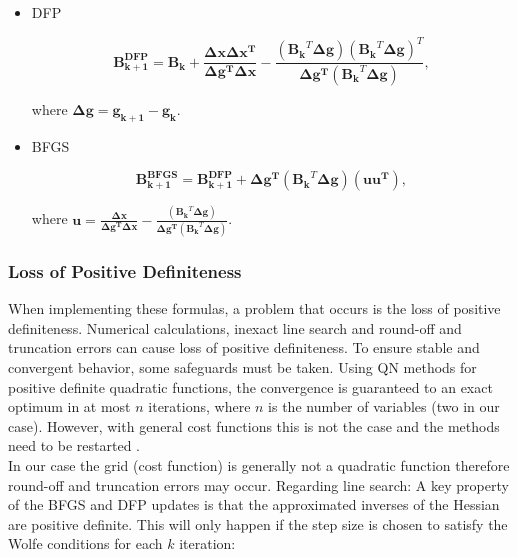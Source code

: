 \begin{itemize}
	\item DFP
	
	\begin{equation}
	 \mathbf{B_{k+1}^{DFP}} =  \mathbf{B_k} + 	\frac{\mathbf{\Delta x}   \mathbf{\Delta x^{T}}}		
	 {\mathbf{\Delta g^{T}}  \mathbf{\Delta x}  } -  \frac{(\mathbf{B_{k}}^{T}  \mathbf{\Delta g}) (\mathbf{B_{k}}^{T}  \mathbf{\Delta g})^{T}  }
	 {\mathbf{\Delta g^{T}} (\mathbf{B_{k}}^{T}  \mathbf{\Delta g})   },
	 \label{eq:DFP}
	\end{equation}
	
	where $\mathbf{\Delta g} = \mathbf{g_{k+1} }- \mathbf{g_k} $.
	
	\item BFGS
	
	\begin{equation}
	\mathbf{B_{k+1}^{BFGS}} =  \mathbf{B_{k+1}^{DFP}} + \mathbf{\Delta g^{T}}(\mathbf{B_{k}}^{T}  \mathbf{\Delta g})(\mathbf{u}  \mathbf{u^{T}})	,
	\end{equation}	
	
	where $\mathbf{u} = \frac{\mathbf{\Delta x}}		
	{\mathbf{\Delta g^{T}}  \mathbf{\Delta x}} - \frac{(\mathbf{B_{k}}^{T}  \mathbf{\Delta g})   }
	{\mathbf{\Delta g^{T}} (\mathbf{B_{k}}^{T}  \mathbf{\Delta g})   }$.
	

\end{itemize}


\subsubsection{Loss of Positive Definiteness}
\label{subsubsec:loss_pdness}

When implementing these formulas, a problem that occurs is the loss of positive definiteness. Numerical calculations, inexact line search and round-off and truncation errors can cause loss of positive definiteness. To ensure stable and convergent behavior, some safeguards must be taken. 
Using QN methods for positive definite quadratic functions, the convergence is guaranteed to an exact optimum in at most $n$ iterations, where $n$ is the number of variables (two in our case).
However, with general cost functions this is not the case and the methods need to be restarted   \cite{intro_opt_design}. \\
%
In our case the grid (cost function) is generally not a quadratic function therefore round-off and truncation errors may occur. 
Regarding line search: A key property of the BFGS and DFP updates is that the approximated inverses of the Hessian are positive definite. This will only happen if the step size is chosen to satisfy the Wolfe conditions for each $k$ iteration:


